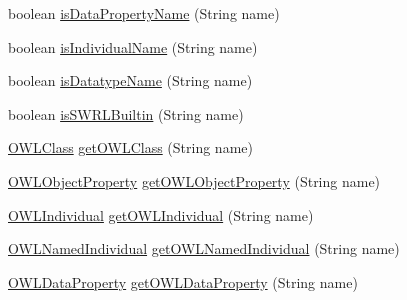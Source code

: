 \begin{DoxyCompactItemize}
\item 
boolean \hyperlink{classorg_1_1coode_1_1owlapi_1_1manchesterowlsyntax_1_1_manchester_o_w_l_syntax_editor_parser_a27baea7ba88cdb8213e3622c3972df39}{is\-Data\-Property\-Name} (String name)
\item 
boolean \hyperlink{classorg_1_1coode_1_1owlapi_1_1manchesterowlsyntax_1_1_manchester_o_w_l_syntax_editor_parser_a32893a775f58aca2081116bbfa51363a}{is\-Individual\-Name} (String name)
\item 
boolean \hyperlink{classorg_1_1coode_1_1owlapi_1_1manchesterowlsyntax_1_1_manchester_o_w_l_syntax_editor_parser_a6d2e0c6d58e71f6fbec3451f56c51f6a}{is\-Datatype\-Name} (String name)
\item 
boolean \hyperlink{classorg_1_1coode_1_1owlapi_1_1manchesterowlsyntax_1_1_manchester_o_w_l_syntax_editor_parser_ab6e7a9af2c7b16b6c7e08d70f171e44f}{is\-S\-W\-R\-L\-Builtin} (String name)
\item 
\hyperlink{interfaceorg_1_1semanticweb_1_1owlapi_1_1model_1_1_o_w_l_class}{O\-W\-L\-Class} \hyperlink{classorg_1_1coode_1_1owlapi_1_1manchesterowlsyntax_1_1_manchester_o_w_l_syntax_editor_parser_aed32d099f6d87aade7693550a4201372}{get\-O\-W\-L\-Class} (String name)
\item 
\hyperlink{interfaceorg_1_1semanticweb_1_1owlapi_1_1model_1_1_o_w_l_object_property}{O\-W\-L\-Object\-Property} \hyperlink{classorg_1_1coode_1_1owlapi_1_1manchesterowlsyntax_1_1_manchester_o_w_l_syntax_editor_parser_aa3940a4bf1279f197deeeb83866db1ff}{get\-O\-W\-L\-Object\-Property} (String name)
\item 
\hyperlink{interfaceorg_1_1semanticweb_1_1owlapi_1_1model_1_1_o_w_l_individual}{O\-W\-L\-Individual} \hyperlink{classorg_1_1coode_1_1owlapi_1_1manchesterowlsyntax_1_1_manchester_o_w_l_syntax_editor_parser_a283f577647f66efd74f4ca6d476d63bf}{get\-O\-W\-L\-Individual} (String name)
\item 
\hyperlink{interfaceorg_1_1semanticweb_1_1owlapi_1_1model_1_1_o_w_l_named_individual}{O\-W\-L\-Named\-Individual} \hyperlink{classorg_1_1coode_1_1owlapi_1_1manchesterowlsyntax_1_1_manchester_o_w_l_syntax_editor_parser_a141417af76a90f04aa7b4e6d94e045b0}{get\-O\-W\-L\-Named\-Individual} (String name)
\item 
\hyperlink{interfaceorg_1_1semanticweb_1_1owlapi_1_1model_1_1_o_w_l_data_property}{O\-W\-L\-Data\-Property} \hyperlink{classorg_1_1coode_1_1owlapi_1_1manchesterowlsyntax_1_1_manchester_o_w_l_syntax_editor_parser_a589c8bda170a568397cc5fc4e07731e4}{get\-O\-W\-L\-Data\-Property} (String name)
\item 

\end{DoxyCompactItemize}
